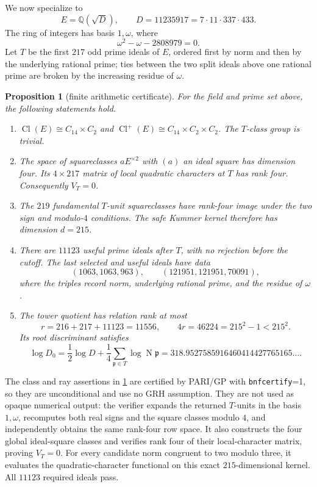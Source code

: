 \documentclass[11pt]{article}
\newtheorem{proposition}[theorem]{Proposition}
\theoremstyle{definition}
\theoremstyle{remark}
\newcommand{\Q}{\mathbb Q}
\newcommand{\Nm}{\operatorname N}
\newcommand{\Cl}{\operatorname{Cl}}
\begin{document}
We now specialize to
\[
 E=\Q(\sqrt D),\qquad D=11235917=7\cdot11\cdot337\cdot433. \tag{5.1}
\]
The ring of integers has basis $1,\omega$, where
\[
 \omega^2-\omega-2808979=0.
\]
Let $T$ be the first $217$ odd prime ideals of $E$, ordered first by norm
and then by the underlying rational prime; ties between the two split ideals
above one rational prime are broken by the increasing residue of $\omega$.

\begin{proposition}[finite arithmetic certificate]\label{prop:certificate}
For the field and prime set above, the following statements hold.
\begin{enumerate}
\item
$\Cl(E)\cong C_{14}\times C_2$ and
$\Cl^+(E)\cong C_{14}\times C_2\times C_2$.
The $T$-class group is trivial.
\item
The space of squareclasses $aE^{\times2}$ with $(a)$ an ideal square has
dimension four.  Its $4\times217$ matrix of local quadratic characters at
$T$ has rank four.  Consequently $V_T=0$.
\item
The $219$ fundamental $T$-unit squareclasses have rank-four image under the
two sign and modulo-$4$ conditions.  The safe Kummer kernel therefore has
dimension $d=215$.
\item
There are $11123$ useful prime ideals after $T$, with no rejection before
the cutoff.  The last selected and useful ideals have data
\[
 (1063,1063,963),\qquad (121951,121951,70091),      \tag{5.2}
\]
where the triples record norm, underlying rational prime, and the residue
of $\omega$.
\item
The tower quotient has relation rank at most
\[
 r=216+217+11123=11556,
 \qquad 4r=46224=215^2-1<215^2.                   \tag{5.3}\label{eq:gs-certificate}
\]
Its root discriminant satisfies
\[
 \log D_0=\frac12\log D+\frac14\sum_{\mathfrak p\in T}
                      \log\Nm\mathfrak p
 =318.9527585916460414427765165\ldots.             \tag{5.4}
\]
\end{enumerate}
\end{proposition}

The class and ray assertions in \cref{prop:certificate} are certified by
PARI/GP with \texttt{bnfcertify}=1, so they are unconditional and use no
GRH assumption.  They are not used as opaque numerical output: the verifier expands
the returned $T$-units in the basis $1,\omega$, recomputes both real signs
and the square classes modulo $4$, and independently obtains the same
rank-four row space.  It also constructs the four global ideal-square
classes and verifies rank four of their local-character matrix, proving
$V_T=0$.  For every candidate norm congruent to two modulo
three, it evaluates the quadratic-character functional on this exact
$215$-dimensional kernel.  All $11123$ required ideals pass.
\end{document}
